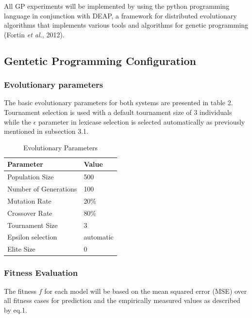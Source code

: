 \documentclass[
  12pt,
]{article}
\begin{document}
All GP experiments will be implemented by using the python programming
language in conjunction with DEAP, a framework for distributed
evolutionary algorithms that implements various tools and algorithms for
genetic programming (Fortin \emph{et al.}, 2012).

\hypertarget{gentetic-programming-configuration}{%
\subsection{Gentetic Programming
Configuration}\label{gentetic-programming-configuration}}

\hypertarget{evolutionary-parameters}{%
\subsubsection{Evolutionary parameters}\label{evolutionary-parameters}}

The basic evolutionary parameters for both systems are presented in
table 2. Tournament selection is used with a default tournament size of
\(3\) individuals while the \(\epsilon\) parameter in lexicase selection
is selected automatically as previously mentioned in subsection 3.1.

\begin{table}[!h]

\caption{\label{tab:unnamed-chunk-2}Evolutionary Parameters}
\centering
\begin{tabular}[t]{l|l}
\hline
\textbf{Parameter} & \textbf{Value}\\
\hline
Population Size & 500\\
\hline
Number of Generations & 100\\
\hline
Mutation Rate & 20\%\\
\hline
Crossover Rate & 80\%\\
\hline
Tournament Size & 3\\
\hline
Epsilon selection & automatic\\
\hline
Elite Size & 0\\
\hline
\end{tabular}
\end{table}

\hypertarget{fitness-evaluation}{%
\subsubsection{Fitness Evaluation}\label{fitness-evaluation}}

The fitness \(f\) for each model will be based on the mean squared error
(MSE) over all fitness cases for prediction and the empirically measured
values as described by eq.1.
\end{document}
